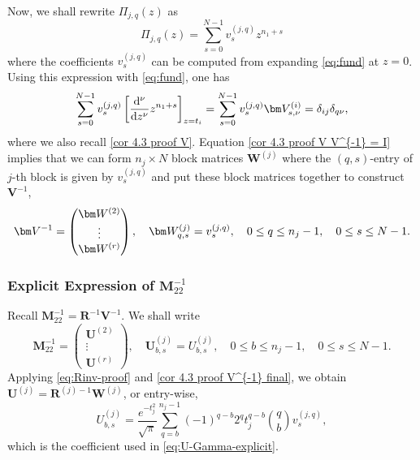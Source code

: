 \documentclass[a4paper,10pt,leqno]{amsart}
\numberwithin{equation}{section}
\theoremstyle{remark}
\newcommand{\dd}{\mathrm{d}}
\begin{document}
Now, we shall rewrite $\Pi_{j,q}(z)$ as
\[
\Pi_{j,q}(z) = \sum_{s=0}^{N-1} v_s^{(j,q)} z^{n_1+s}
\]
where the coefficients $v_s^{(j,q)}$ can be computed from expanding \eqref{eq:fund} at $z=0$. 
Using this expression with \eqref{eq:fund}, one has
\begin{equation} \label{cor 4.3 proof V V^{-1} = I}
    \sum_{s=0}^{N-1}v_s^{(j,q)} \left[\frac{\dd^\nu}{\dd z^\nu}z^{n_1+s}\right]_{z=t_i} = \sum_{s=0}^{N-1}v_s^{(j,q)} \bm V^{(i)}_{s,\nu} =  \delta_{ij}\delta_{q\nu},
\end{equation}
where we also recall \eqref{cor 4.3 proof V}.
Equation \eqref{cor 4.3 proof V V^{-1} = I} implies that we can form $n_j \times N$ block matrices $\bm W^{(j)}$ where the $(q,s)$-entry of $j$-th block is given by $v_s^{(j,q)}$ and put these block matrices together to construct $\bm V^{-1}$,
\begin{equation} \label{cor 4.3 proof V^{-1} final}
    \bm V^{-1}=\begin{pmatrix}\bm W^{(2)}\\ \vdots\\ \bm W^{(r)}\end{pmatrix}, \quad \bm W^{(j)}_{q,s} = v_s^{(j,q)}, \quad 0 \leq q \leq n_j-1, \quad 0 \leq s \leq N-1.
\end{equation}

\subsubsection{Explicit Expression of $\boldsymbol{M}_{22}^{-1}$}

Recall $\bm M_{22}^{-1} = \bm R^{-1} \bm V^{-1}$. We shall write
\begin{equation}\label{eq:U-proof-M-inv}
    \bm M_{22}^{-1}=\begin{pmatrix}\bm U^{(2)}\\ \vdots\\ \bm U^{(r)}\end{pmatrix}, \quad
    \bm U^{(j)}_{b,s}=U^{(j)}_{b,s}, \quad 0\leq b\leq n_j-1, \quad 0\leq s\leq N-1.
\end{equation}
Applying \eqref{eq:Rinv-proof} and \eqref{cor 4.3 proof V^{-1} final}, we obtain $\bm U^{(j)} = \bm R^{(j)-1} \bm W^{(j)}$, or entry-wise,
\begin{equation}\label{eq:U-proof}
    U^{(j)}_{b,s}=\frac{e^{-t_j^2}}{\sqrt{\pi}}\sum_{q=b}^{n_j-1}(-1)^{q-b}2^q t_j^{q-b}\binom{q}{b}v_s^{(j,q)},
\end{equation}
which is the coefficient used in \eqref{eq:U-Gamma-explicit}.
\end{document}
